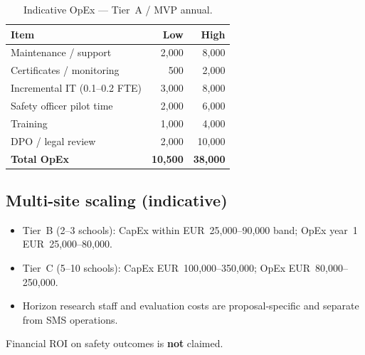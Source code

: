 \begin{table}[htbp]
  \centering
  \caption{Indicative OpEx --- Tier~A / MVP annual.}
  \label{tab:opex-mvp}
  \small
  \begin{tabular}{@{}lrr@{}}
    \toprule
    Item & Low & High \\
    \midrule
    Maintenance / support & 2{,}000 & 8{,}000 \\
    Certificates / monitoring & 500 & 2{,}000 \\
    Incremental IT (0.1--0.2 FTE) & 3{,}000 & 8{,}000 \\
    Safety officer pilot time & 2{,}000 & 6{,}000 \\
    Training & 1{,}000 & 4{,}000 \\
    DPO / legal review & 2{,}000 & 10{,}000 \\
    \midrule
    \textbf{Total OpEx} & \textbf{10{,}500} & \textbf{38{,}000} \\
    \bottomrule
  \end{tabular}
\end{table}

\subsection{Multi-site scaling (indicative)}

\begin{itemize}[noitemsep]
  \item Tier~B (2--3 schools): CapEx within EUR~25{,}000--90{,}000 band; OpEx year~1 EUR~25{,}000--80{,}000.
  \item Tier~C (5--10 schools): CapEx EUR~100{,}000--350{,}000; OpEx EUR~80{,}000--250{,}000.
  \item Horizon research staff and evaluation costs are proposal-specific and separate from SMS operations.
\end{itemize}

Financial ROI on safety outcomes is \textbf{not} claimed.
